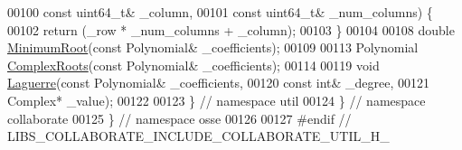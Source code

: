 \begin{DoxyCode}
00100                       \textcolor{keyword}{const} uint64\_t& \_column,
00101                       \textcolor{keyword}{const} uint64\_t& \_num\_columns) \{
00102   \textcolor{keywordflow}{return} (\_row * \_num\_columns + \_column);
00103 \}
00104 
00108 \textcolor{keywordtype}{double} \hyperlink{util_8h_a8f96efc8962a36fc0f5f4c4513bb1ed6}{MinimumRoot}(\textcolor{keyword}{const} Polynomial& \_coefficients);
00109 
00113 Polynomial \hyperlink{util_8h_ac5254bd53737bca048d12dbda092ddc7}{ComplexRoots}(\textcolor{keyword}{const} Polynomial& \_coefficients);
00114 
00119 \textcolor{keywordtype}{void} \hyperlink{util_8h_ac3a132af1e7f25403fc93320ed288ef9}{Laguerre}(\textcolor{keyword}{const} Polynomial& \_coefficients,
00120               \textcolor{keyword}{const} \textcolor{keywordtype}{int}& \_degree,
00121               Complex* \_value);
00122 
00123 \}  \textcolor{comment}{// namespace util}
00124 \}  \textcolor{comment}{// namespace collaborate}
00125 \}  \textcolor{comment}{// namespace osse}
00126 
00127 \textcolor{preprocessor}{#endif  // LIBS\_COLLABORATE\_INCLUDE\_COLLABORATE\_UTIL\_H\_}
\end{DoxyCode}

